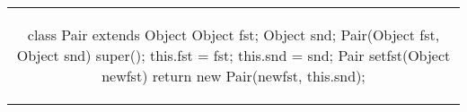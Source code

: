 \begin{tabular}{c}
\begin{java}
class Pair extends Object {
    Object fst;
    Object snd;
    Pair(Object fst, Object snd) {
        super(); this.fst = fst; this.snd = snd;
    }
    Pair setfst(Object newfst) {
        return new Pair(newfst, this.snd);
    }
}
\end{java}
\end{tabular}
